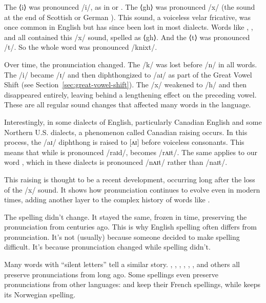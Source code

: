 The ⟨i⟩ was pronounced /i/, as in  or . The ⟨gh⟩ was pronounced /x/ (the sound at the end of Scottish  or German ). This sound, a voiceless velar fricative, was once common in English but has since been lost in most dialects. Words like , , and  all contained this /x/ sound, spelled as ⟨gh⟩. And the ⟨t⟩ was pronounced /t/. So the whole word was pronounced /knixt/.

Over time, the pronunciation changed. The /k/ was lost before /n/ in all words. The /i/ became /ɪ/ and then diphthongized to /aɪ/ as part of the Great Vowel Shift (see Section~\ref{sec:great-vowel-shift}). The /x/ weakened to /h/ and then disappeared entirely, leaving behind a lengthening effect on the preceding vowel. These are all regular sound changes that affected many words in the language.

Interestingly, in some dialects of English, particularly Canadian English and some Northern U.S. dialects, a phenomenon called Canadian raising occurs. In this process, the /aɪ/ diphthong is raised to [ʌɪ] before voiceless consonants. This means that while  is pronounced /raɪd/,  becomes /rʌɪt/. The same applies to our word , which in these dialects is pronounced /nʌɪt/ rather than /naɪt/.

This raising is thought to be a recent development, occurring long after the loss of the /x/ sound. It shows how pronunciation continues to evolve even in modern times, adding another layer to the complex history of words like .

The spelling didn't change. It stayed the same, frozen in time, preserving the pronunciation from centuries ago. This is why English spelling often differs from pronunciation. It's not (usually) because someone decided to make spelling difficult. It's because pronunciation changed while spelling didn't.

Many words with \enquote{silent letters} tell a similar story. , , , , , , and others all preserve pronunciations from long ago. Some spellings even preserve pronunciations from other languages:  and  keep their French spellings, while  keeps its Norwegian spelling.

